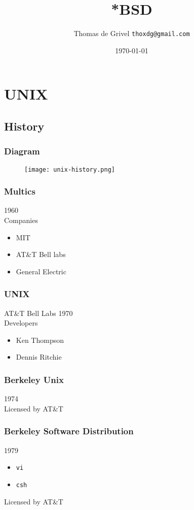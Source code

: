 \documentclass[8pt]{beamer}
\title{*BSD}
\author{Thomas de Grivel {\tt thoxdg@gmail.com}}
\institute{http://kmx.io}
\date{\today}
\begin{document}
\begin{frame}
\titlepage
\end{frame}

\section{UNIX}
\subsection{History}

\begin{frame}
  \frametitle{Diagram}
  \begin{figure}[h!]
    \texttt{[image: unix-history.png]}
    \label{UNIX}
  \end{figure}
\end{frame}

\begin{frame}
  \frametitle{Multics}
  1960\\
  \vspace{1em}
  Companies
  \begin{itemize}
  \item MIT
  \item AT\&T Bell labs
  \item General Electric
  \end{itemize}
  \vspace{1em}
\end{frame}

\begin{frame}
  \frametitle{UNIX}
  AT\&T Bell Labs 1970 \\
  \vspace{1em}
  Developers
  \begin{itemize}
  \item Ken Thompson
  \item Dennis Ritchie
  \end{itemize}
\end{frame}

\begin{frame}
  \frametitle{Berkeley Unix}
  1974 \\
  \vspace{1em}
  Licensed by AT\&T
\end{frame}

\begin{frame}
  \frametitle{Berkeley Software Distribution}
  1979 \\
  \vspace{1em}
  \begin{itemize}
  \item {\tt vi}
  \item {\tt csh}
  \end{itemize}
  \vspace{1em}
  Licensed by AT\&T
\end{frame}
\end{document}
